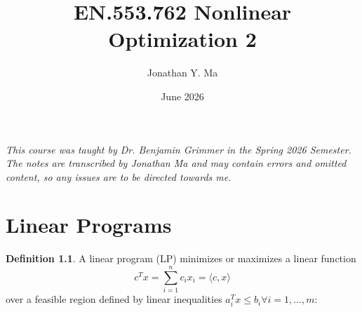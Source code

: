 \documentclass[12pt,oneside]{book}
\title{EN.553.762 Nonlinear Optimization 2}
\author{Jonathan Y. Ma}
\date{June 2026}
\numberwithin{equation}{section}
\theoremstyle{definition}
\newtheorem{definition}{Definition}[section]
\theoremstyle{plain}
\theoremstyle{remark}
\begin{document}
\maketitle

\noindent \emph{This course was taught by Dr. Benjamin Grimmer in the Spring 2026 Semester. The notes are transcribed by Jonathan Ma and may contain errors and omitted content, so any issues are to be directed towards me.}

\tableofcontents

\newpage
\chapter{Linear Programs}

\begin{definition}
    A linear program (LP) minimizes or maximizes a linear function 
    $$
    c^Tx = \sum_{i=1}^{n} c_i x_i = \langle c , x \rangle
    $$ 
    over a feasible region defined by linear inequalities $a_i^T x \le b_i \forall i = 1,...,m$:
\end{definition}
\end{document}
